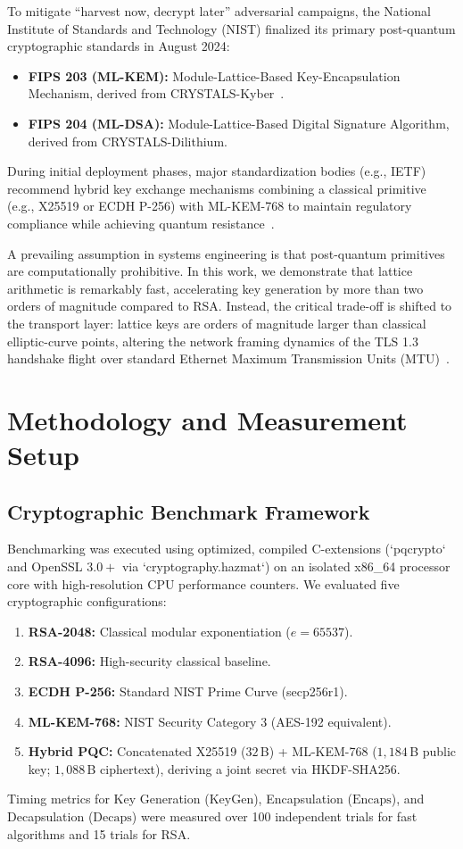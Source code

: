 \documentclass[10pt,twocolumn,a4paper]{article}
\begin{document}
To mitigate ``harvest now, decrypt later'' adversarial campaigns, the National Institute of Standards and Technology (NIST) finalized its primary post-quantum cryptographic standards in August 2024:
\begin{itemize}
    \item \textbf{FIPS 203 (ML-KEM):} Module-Lattice-Based Key-Encapsulation Mechanism, derived from CRYSTALS-Kyber~\cite{bos2018}.
    \item \textbf{FIPS 204 (ML-DSA):} Module-Lattice-Based Digital Signature Algorithm, derived from CRYSTALS-Dilithium.
\end{itemize}

During initial deployment phases, major standardization bodies (e.g., IETF) recommend hybrid key exchange mechanisms combining a classical primitive (e.g., X25519 or ECDH P-256) with ML-KEM-768 to maintain regulatory compliance while achieving quantum resistance~\cite{schwabe2020}.

A prevailing assumption in systems engineering is that post-quantum primitives are computationally prohibitive. In this work, we demonstrate that lattice arithmetic is remarkably fast, accelerating key generation by more than two orders of magnitude compared to RSA. Instead, the critical trade-off is shifted to the transport layer: lattice keys are orders of magnitude larger than classical elliptic-curve points, altering the network framing dynamics of the TLS 1.3 handshake flight over standard Ethernet Maximum Transmission Units (MTU)~\cite{paquin2020,sikeridis2020}.

\section{Methodology and Measurement Setup}

\subsection{Cryptographic Benchmark Framework}
Benchmarking was executed using optimized, compiled C-extensions (`pqcrypto` and OpenSSL $3.0+$ via `cryptography.hazmat`) on an isolated x86\_64 processor core with high-resolution CPU performance counters. We evaluated five cryptographic configurations:
\begin{enumerate}
    \item \textbf{RSA-2048:} Classical modular exponentiation ($e=65537$).
    \item \textbf{RSA-4096:} High-security classical baseline.
    \item \textbf{ECDH P-256:} Standard NIST Prime Curve (secp256r1).
    \item \textbf{ML-KEM-768:} NIST Security Category 3 (AES-192 equivalent).
    \item \textbf{Hybrid PQC:} Concatenated X25519 ($32\,$B) + ML-KEM-768 ($1{,}184\,$B public key; $1{,}088\,$B ciphertext), deriving a joint secret via HKDF-SHA256.
\end{enumerate}
Timing metrics for Key Generation ($\mathrm{KeyGen}$), Encapsulation ($\mathrm{Encaps}$), and Decapsulation ($\mathrm{Decaps}$) were measured over 100 independent trials for fast algorithms and 15 trials for RSA.
\end{document}
